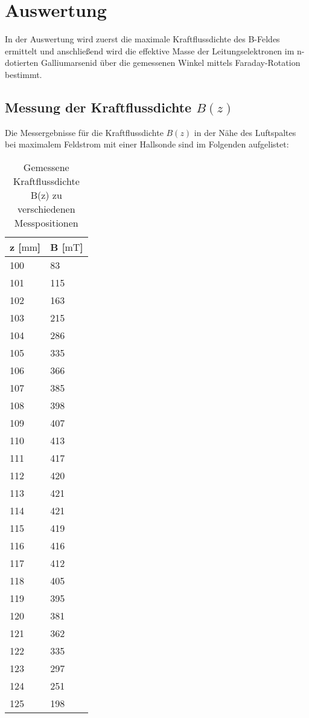 \section{Auswertung}
\label{sec:Auswertung}
In der Auswertung wird zuerst die maximale Kraftflussdichte des B-Feldes ermittelt und anschließend wird die effektive Masse der Leitungselektronen im n-dotierten Galliumarsenid über die gemessenen Winkel mittels Faraday-Rotation bestimmt.

\subsection{Messung der Kraftflussdichte $B(z)$}
Die Messergebnisse für die Kraftflussdichte $B(z)$ in der Nähe des
Luftspaltes bei maximalem Feldstrom mit einer Hallsonde sind im Folgenden aufgelistet:

\begin{table}[H]
    \centering
    \caption{Gemessene Kraftflussdichte B(z) zu verschiedenen Messpositionen}
    \label{tab:bfeld}
    \begin{tabular}{ll}
        \toprule
    z [$\si{\milli\meter}$] & B [$\si{\milli\tesla}$] \\
        \midrule
    100    & 83     \\
    101    & 115    \\
    102    & 163    \\
    103    & 215    \\
    104    & 286    \\
    105    & 335    \\
    106    & 366    \\
    107    & 385    \\
    108    & 398    \\
    109    & 407    \\
    110    & 413    \\
    111    & 417    \\
    112    & 420    \\
    113    & 421    \\
    114    & 421    \\
    115    & 419    \\
    116    & 416    \\
    117    & 412    \\
    118    & 405    \\
    119    & 395    \\
    120    & 381    \\
    121    & 362    \\
    122    & 335    \\
    123    & 297    \\
    124    & 251    \\
    125    & 198   \\
        \bottomrule    
    \end{tabular}
    \end{table}

